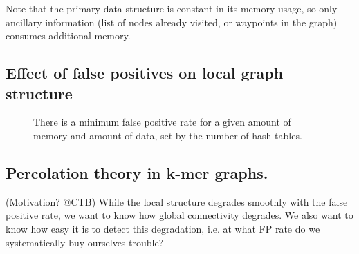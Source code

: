 \documentclass[12pt]{article} \usepackage{simplemargins}
\begin{document}
Note that the primary data structure is constant in its memory usage,
so only ancillary information (list of nodes already visited, or
waypoints in the graph) consumes additional memory.

\subsection{Effect of false positives on local graph structure}


\begin{figure}
\caption{There is a minimum false positive rate for a given amount of memory
and amount of data, set by the number of hash tables.}
\end{figure}

\subsection{Percolation theory in k-mer graphs.}

(Motivation? @CTB) While the local structure degrades smoothly with the
false positive rate, we want to know how global connectivity degrades.
We also want to know how easy it is to detect this degradation, i.e. at
what FP rate do we systematically buy ourselves trouble?
\end{document}
